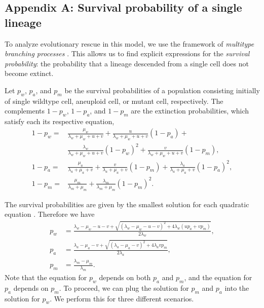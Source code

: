 \documentclass[12pt]{extarticle}
\begin{document}
\begin{appendices}
\renewcommand{\theequation}{\thesection\arabic{equation}}

\section*{Appendix A: Survival probability of a single lineage}\label{sec:appendix-surv-prob}

To analyze evolutionary rescue in this model, we use the framework of \emph{multitype branching processes} \citep{harris1963theory, weissman2009rate}. 
This allows us to find explicit expressions for the \emph{survival probability}: the probability that a lineage descended from a single cell does not become extinct.

Let $p_w$, $p_a$, and $p_m$ be the survival probabilities of a population consisting initially of single wildtype cell, aneuploid cell, or mutant cell, respectively.
The complements $1-p_w$, $1-p_a$, and $1-p_m$ are the extinction probabilities, which satisfy each its respective equation,
\begin{equation} \label{eq:extinction_prob}
\begin{aligned}
1-p_w = &\frac{\mu_w}{\lambda_w+\mu_w+u+v} + 
		  \frac{u}{\lambda_w+\mu_w+u+v}\left(1-p_a\right) + \\
		  & \frac{\lambda_w}{\lambda_w+\mu_w+u+v}\left(1-p_w\right)^2 +
		  \frac{v}{\lambda_w+\mu_w+u+v}\left(1-p_m\right) ,\\
1-p_a = &\frac{\mu_a}{\lambda_a+\mu_a+v}+\frac{v}{\lambda_a+\mu_a+v}\left(1-p_m\right)+\frac{\lambda_a}{\lambda_a+\mu_a+v}\left(1-p_a\right)^2 ,\\
1-p_m = &\frac{\mu_m}{\lambda_m+\mu_m}+\frac{\lambda_m}{\lambda_m+\mu_m}\left(1-p_m\right)^2 .	 
\end{aligned}
\end{equation}

The survival probabilities are given by the smallest solution for each quadratic equation \citep{uecker2015adaptive}. Therefore we have
\begin{equation}\label{eq:survival_prob}
\begin{aligned}
p_w &= \frac{\lambda_w-\mu_w-u-v+\sqrt{\left(\lambda_w-\mu_w-u-v\right)^2+4\lambda_w\left(up_a+vp_m\right)}}{2\lambda_w} ,\\
p_a &= \frac{\lambda_a-\mu_a-v+\sqrt{\left(\lambda_a-\mu_a-v\right)^2+4\lambda_avp_m}}{2\lambda_a}, \\
p_m &= \frac{\lambda_m-\mu_m}{\lambda_m} .
\end{aligned} 
\end{equation}
Note that the equation for $p_w$ depends on both $p_a$ and $p_m$, and the equation for $p_a$ depends on $p_m$.
To proceed, we can plug the solution for $p_m$ and $p_a$ into the solution for $p_w$. We perform this for three different scenarios.


\end{appendices}
\end{document}
